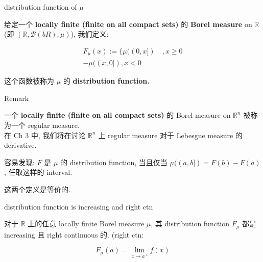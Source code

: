 \documentclass{qlnotes-export}
\begin{document}
\begin{definition}{distribution function of \(\mu\)}\label{def-03-distribution-function-lebesgue-stieltjes-measures-distribution-function-of-mu}

给定一个 \textbf{locally finite (finite on all compact sets)} 的 \textbf{Borel measure} on \(\mathbb{R}\) (即 \(({\mathbb{R}},\mathcal{B}(bR),\mu)\)), 我们定义:

\[\begin{matrix}
{F_{\mu}(x) := \{\mu((0,x\rbrack)\quad,x \geq 0} \\
{- \mu((x,0\rbrack),x < 0}
\end{matrix}\]

这个函数被称为 \(\mu\) 的 \textbf{distribution function.}

\end{definition}

\begin{qlremark}{Remark}

一个 \textbf{locally finite (finite on all compact sets)} 的 Borel measure on \({\mathbb{R}}^{n}\) 被称为一个 regular measure.\\
在 Ch 3 中, 我们将在讨论 \({\mathbb{R}}^{n}\) 上 regular measure 对于 Lebesgue measure 的 derivative.

\end{qlremark}

\begin{proposition}\label{prop-03-distribution-function-lebesgue-stieltjes-measures-proposition-001}

容易发现: \(F\) 是 \(\mu\) 的 distribution function, 当且仅当 \(\mu((a,b\rbrack) = F(b) - F(a)\), 任取这样的 interval.

\end{proposition}

这两个定义是等价的.

\begin{theorem}{distribution function is increasing and right ctn}\label{thm-03-distribution-function-lebesgue-stieltjes-measures-distribution-function-is-increasing-and-right-ctn}

对于 \(\mathbb{R}\) 上的任意 locally finite Borel measure \(\mu\), 其 distribution function \(F_{\mu}\) 都是 increasing 且 right continuous 的. (right ctn:

\[F_{\mu}(a) = \lim\limits_{x\rightarrow a^{+}}f(x)\]

\end{theorem}
\end{document}
